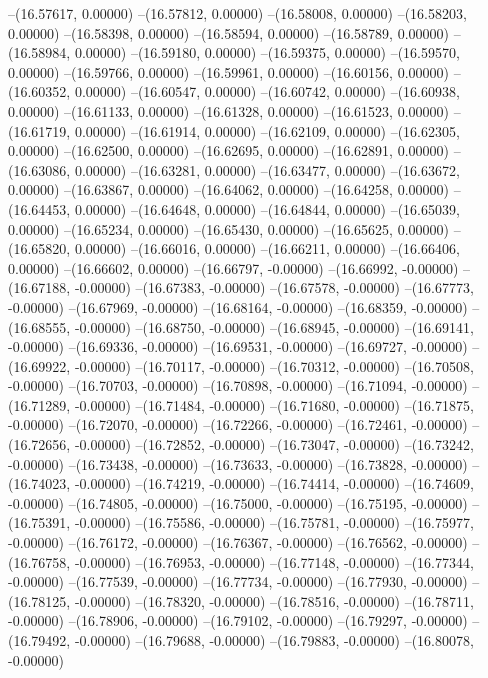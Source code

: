 --(16.57617, 0.00000)
--(16.57812, 0.00000)
--(16.58008, 0.00000)
--(16.58203, 0.00000)
--(16.58398, 0.00000)
--(16.58594, 0.00000)
--(16.58789, 0.00000)
--(16.58984, 0.00000)
--(16.59180, 0.00000)
--(16.59375, 0.00000)
--(16.59570, 0.00000)
--(16.59766, 0.00000)
--(16.59961, 0.00000)
--(16.60156, 0.00000)
--(16.60352, 0.00000)
--(16.60547, 0.00000)
--(16.60742, 0.00000)
--(16.60938, 0.00000)
--(16.61133, 0.00000)
--(16.61328, 0.00000)
--(16.61523, 0.00000)
--(16.61719, 0.00000)
--(16.61914, 0.00000)
--(16.62109, 0.00000)
--(16.62305, 0.00000)
--(16.62500, 0.00000)
--(16.62695, 0.00000)
--(16.62891, 0.00000)
--(16.63086, 0.00000)
--(16.63281, 0.00000)
--(16.63477, 0.00000)
--(16.63672, 0.00000)
--(16.63867, 0.00000)
--(16.64062, 0.00000)
--(16.64258, 0.00000)
--(16.64453, 0.00000)
--(16.64648, 0.00000)
--(16.64844, 0.00000)
--(16.65039, 0.00000)
--(16.65234, 0.00000)
--(16.65430, 0.00000)
--(16.65625, 0.00000)
--(16.65820, 0.00000)
--(16.66016, 0.00000)
--(16.66211, 0.00000)
--(16.66406, 0.00000)
--(16.66602, 0.00000)
--(16.66797, -0.00000)
--(16.66992, -0.00000)
--(16.67188, -0.00000)
--(16.67383, -0.00000)
--(16.67578, -0.00000)
--(16.67773, -0.00000)
--(16.67969, -0.00000)
--(16.68164, -0.00000)
--(16.68359, -0.00000)
--(16.68555, -0.00000)
--(16.68750, -0.00000)
--(16.68945, -0.00000)
--(16.69141, -0.00000)
--(16.69336, -0.00000)
--(16.69531, -0.00000)
--(16.69727, -0.00000)
--(16.69922, -0.00000)
--(16.70117, -0.00000)
--(16.70312, -0.00000)
--(16.70508, -0.00000)
--(16.70703, -0.00000)
--(16.70898, -0.00000)
--(16.71094, -0.00000)
--(16.71289, -0.00000)
--(16.71484, -0.00000)
--(16.71680, -0.00000)
--(16.71875, -0.00000)
--(16.72070, -0.00000)
--(16.72266, -0.00000)
--(16.72461, -0.00000)
--(16.72656, -0.00000)
--(16.72852, -0.00000)
--(16.73047, -0.00000)
--(16.73242, -0.00000)
--(16.73438, -0.00000)
--(16.73633, -0.00000)
--(16.73828, -0.00000)
--(16.74023, -0.00000)
--(16.74219, -0.00000)
--(16.74414, -0.00000)
--(16.74609, -0.00000)
--(16.74805, -0.00000)
--(16.75000, -0.00000)
--(16.75195, -0.00000)
--(16.75391, -0.00000)
--(16.75586, -0.00000)
--(16.75781, -0.00000)
--(16.75977, -0.00000)
--(16.76172, -0.00000)
--(16.76367, -0.00000)
--(16.76562, -0.00000)
--(16.76758, -0.00000)
--(16.76953, -0.00000)
--(16.77148, -0.00000)
--(16.77344, -0.00000)
--(16.77539, -0.00000)
--(16.77734, -0.00000)
--(16.77930, -0.00000)
--(16.78125, -0.00000)
--(16.78320, -0.00000)
--(16.78516, -0.00000)
--(16.78711, -0.00000)
--(16.78906, -0.00000)
--(16.79102, -0.00000)
--(16.79297, -0.00000)
--(16.79492, -0.00000)
--(16.79688, -0.00000)
--(16.79883, -0.00000)
--(16.80078, -0.00000)
